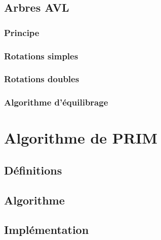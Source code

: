 \documentclass{article}
\begin{document}
\subsection{Arbres AVL}

\subsubsection{Principe}

\subsubsection{Rotations simples}

\subsubsection{Rotations doubles}

\subsubsection{Algorithme d'équilibrage}

\section{Algorithme de PRIM}

\subsection{Définitions}

\subsection{Algorithme}

\subsection{Implémentation}
\end{document}
